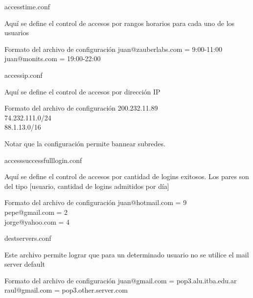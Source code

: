 \documentclass{beamer}
\begin{document}
\begin{frame}{access\textunderscore time.conf}

\par Aquí se define el control de accesos por rangos horarios para cada uno de los usuarios\\[0.5cm]

\begin{block}{Formato del archivo de configuración}
juan@zauberlabs.com = 9:00-11:00\\
juan@monits.com = 19:00-22:00\\
\end{block}

\end{frame}

\begin{frame}{access\textunderscore ip.conf}

\par Aquí se define el control de accesos por dirección IP \\[0.5cm]

\begin{block}{Formato del archivo de configuración}
200.232.11.89\\
74.232.111.0/24\\
88.1.13.0/16\\
\end{block}

\par Notar que la configuración permite bannear subredes.

\end{frame}

\begin{frame}{access\textunderscore successfull\textunderscore login.conf}

\par Aquí se define el control de accesos por cantidad de logins exitosos. Los pares son del tipo [usuario, cantidad de logins admitidos por día]\\[0.5cm]

\begin{block}{Formato del archivo de configuración}
juan@hotmail.com = 9\\
pepe@gmail.com = 2\\
jorge@yahoo.com = 4\\
\end{block}

\end{frame}

\begin{frame}{dest\textunderscore servers.conf}

\par Este archivo permite lograr que para un determinado usuario no se utilice el mail server default\\[0.5cm]

\begin{block}{Formato del archivo de configuración}
juan@gmail.com = pop3.alu.itba.edu.ar\\
raul@gmail.com = pop3.other.server.com\\
\end{block}

\end{frame}
\end{document}
